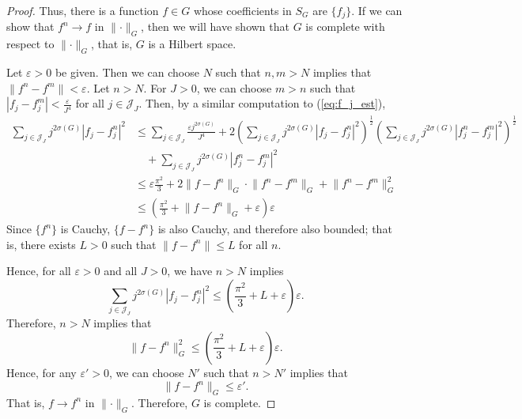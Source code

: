 \documentclass{homework}
\begin{document}
\begin{arabicparts}
\begin{proof}
			Thus, there is a function $f \in G$ whose coefficients in $S_G$ are $\{f_j\}$. If we can show that $f^n \to f$ in $\lVert \cdot \rVert_G$, then we will have shown that $G$ is complete with respect to $\lVert \cdot\rVert_G$, that is, $G$ is a Hilbert space.
			
			Let $\varepsilon > 0$ be given. Then we can choose $N$ such that $n,m > N$ implies that $\lVert f^n - f^m \rVert < \varepsilon$. Let $n > N$. For $J > 0$, we can choose $m > n$ such that $|f_j-f^m_j| < \frac{\varepsilon}{J^4}$ for all $j \in \mathcal{J}_J$. Then, by a similar computation to (\ref{eq:f_j_est}),
			\begin{equation}
				\begin{aligned}
				\sum_{j\in\mathcal{J}_J} j^{2\sigma(G)}|f_j - f^n_j|^2 &\le \sum_{j\in\mathcal{J}_J}\frac{\varepsilon j^{2\sigma(G)}}{J^4} + 2\left(\sum_{j\in\mathcal{J}_J}j^{2\sigma(G)}|f_j-f^n_j|^2\right)^\frac{1}{2}\left(\sum_{j\in\mathcal{J}_J}j^{2\sigma(G)}|f^n_j-f^m_j|^2\right)^\frac{1}{2}
				\quad \\
				&\quad{}+ \sum_{j\in\mathcal{J}_J}j^{2\sigma(G)}|f^n_j - f^m_j|^2\\
				&\le \varepsilon\frac{\pi^2}{3} + 2\lVert f-f^n\rVert_G\cdot\lVert f^n - f^m\rVert_G + \lVert f^n - f^m\rVert_G^2 \\
				&\le \left(\frac{\pi^2}{3} + \lVert f-f^n\rVert_G + \varepsilon\right)\varepsilon
				\end{aligned}
			\end{equation}
			Since $\{f^n\}$ is Cauchy, $\{f-f^n\}$ is also Cauchy, and therefore also bounded; that is, there exists $L > 0$ such that $\lVert f-f^n\rVert \le L$ for all $n$. 
			
			Hence, for all $\varepsilon > 0$ and all $J > 0$, we have $n>N$ implies
			\begin{equation}
				\sum_{j\in\mathcal{J}_J}j^{2\sigma(G)}|f_j-f^n_j|^2 \le \left(\frac{\pi^2}{3}+L + \varepsilon\right)\varepsilon.
			\end{equation}
			Therefore, $n > N$ implies that
			\begin{equation}
				\lVert f-f^n\rVert_G^2 \le \left(\frac{\pi^2}{3}+L+\varepsilon\right)\varepsilon.
			\end{equation}
			Hence, for any $\varepsilon' > 0$, we can choose $N'$ such that $n > N'$ implies that
			\begin{equation}
				\lVert f-f^n\rVert_G \le \varepsilon'.
			\end{equation}
			That is, $f \to f^n$ in $\lVert\cdot\rVert_G$. Therefore, $G$ is complete.
			

\end{proof}
\end{arabicparts}
\end{document}

